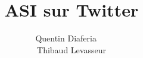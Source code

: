 \documentclass[a4paper,12pt]{article}
\title{ASI sur Twitter}
\author{Quentin Diaferia ~~\\ Thibaud Levasseur}
\begin{document}
\maketitle
\begin{center}
\end{center}
\newpage
\tableofcontents
\newpage
%
%
%
%
%
\end{document}
